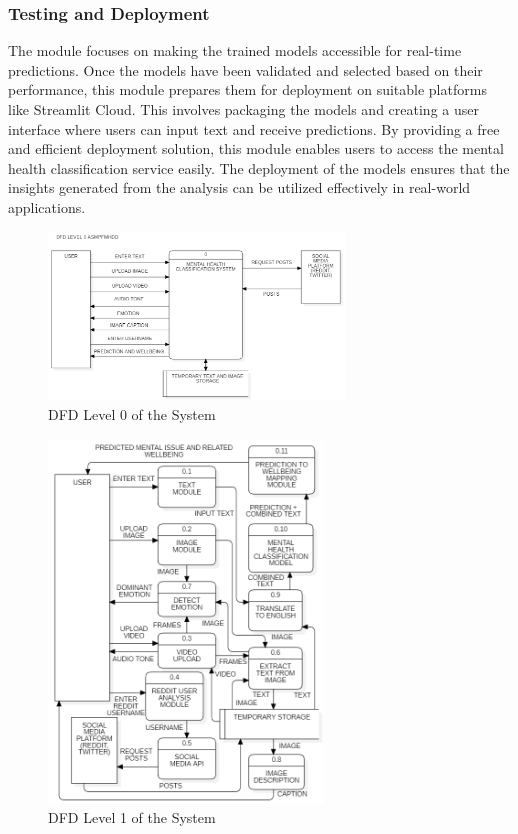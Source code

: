 \subsubsection{Testing and Deployment}
\noindent
The module focuses on making the trained models accessible for real-time predictions. Once the models have been validated and selected based on their performance, this module prepares them for deployment on suitable platforms like Streamlit Cloud. This involves packaging the models and creating a user interface where users can input text and receive predictions. By providing a free and efficient deployment solution, this module enables users to access the mental health classification service easily. The deployment of the models ensures that the insights generated from the analysis can be utilized effectively in real-world applications.

\begin{figure}[h!]  
    \centering
    \includegraphics[width=0.7\textwidth]{Images/DFD L0.png}  
    \caption{DFD Level 0 of the System}
    \label{dfdl0123}  %
\end{figure}

\pagebreak

\begin{figure}[h!]  
    \centering
    \includegraphics[width=0.65\textwidth]{Images/DFD L1.png}  
    \caption{DFD Level 1 of the System}
    \label{dfdl1234}  %
\end{figure}

